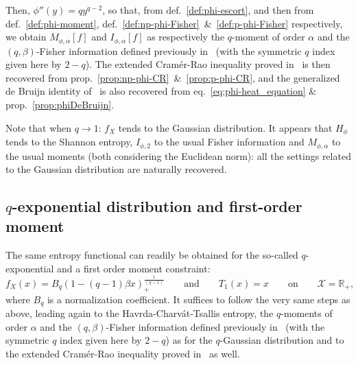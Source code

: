 \documentclass[entropy,article,submit,moreauthors,pdftex]{Definitions/mdpi}
\def\Rset{\mathbb{R}}%
\def\X{\mathcal{X}}%
\begin{document}
Then, $\phi''(y) = q y^{q-2}$, so that, from def.~\ref{def:phi-escort}, and then
from                                                  def.~\ref{def:phi-moment},
def.~\ref{def:np-phi-Fisher}~\&~\ref{def:p-phi-Fisher}  respectively, we  obtain
$M_{\phi,\alpha}[f]$ and $I_{\phi,\alpha}[f]$ as  respectively the $q$-moment of
order  $\alpha$  and  the   $(q,\beta)$-Fisher  information  defined  previously
in~\cite{LutYan05, LutYan07,  LutLv12, Ber12:06_1, Ber12:06_2, Ber13}  (with the
symmetric $q$ index  given here by $2-q$). The  extended Cram\'er-Rao inequality
proved   in~\cite{LutYan05,   Ber12:06_2,   Ber13}  is   then   recovered   from
prop.~\ref{prop:np-phi-CR}~\&~\ref{prop:p-phi-CR}, and the generalized de Bruijn
identity       of~\cite{Ber13:08}       is       also       recovered       from
eq.~\eqref{eq:phi-heat_equation} \& prop.~\ref{prop:phiDeBruijn}.

Note that when $q  \to 1$: $f_X$ tends to the  Gaussian distribution. It appears
that $H_\phi$  tends to the  Shannon entropy,  $I_{\phi,2}$ to the  usual Fisher
information and  $M_{\phi,\alpha}$ to  the usual  moments (both  considering the
Euclidean  norm): all  the settings  related  to the  Gaussian distribution  are
naturally recovered.




\subsection{$q$-exponential distribution and first-order moment}
\label{subsecapp:qExponentialFirstOrder}

The  same  entropy  functional  can   readily  be  obtained  for  the  so-called
$q$-exponential and a first order moment constraint:
% 
\[
f_X(x)  =  B_q \left(  1  -  (q-1)  \beta x  \right)_+^{\frac{1}{(q-1)}}  \qquad
\mbox{and} \qquad T_1(x) = x \qquad \mbox{on} \qquad \X = \Rset_+,
\]
%
where $B_q$ is a normalization coefficient.  It suffices to follow the very same
steps  as above,  leading  again to  the  Havrda-Charv\'at-Tsallis entropy,  the
$q$-moments  of order  $\alpha$ and  the $(q,\beta)$-Fisher  information defined
previously in~\cite{LutYan05, LutYan07,  LutLv12, Ber12:06_1, Ber12:06_2, Ber13}
(with  the symmetric  $q$ index  given here  by $2-q$)  as for  the $q$-Gaussian
distribution   and    to   the    extended   Cram\'er-Rao    inequality   proved
in~\cite{Ber12:06_2, Ber13} as well.
\end{document}
